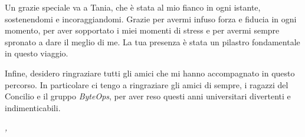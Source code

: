 \vspace{10pt}
\noindent Un grazie speciale va a Tania, che è stata al mio fianco in ogni istante, sostenendomi e incoraggiandomi. Grazie per avermi infuso forza e fiducia in ogni momento, per aver sopportato i miei momenti di stress e per avermi sempre spronato a dare il meglio di me. La tua presenza è stata un pilastro fondamentale in questo viaggio.

\vspace{10pt}
\noindent Infine, desidero ringraziare tutti gli amici che mi hanno accompagnato in questo percorso. In particolare ci tengo a ringraziare gli amici di sempre, i ragazzi del Concilio e il gruppo \textit{ByteOps}, per aver reso questi anni universitari divertenti e indimenticabili.

\vspace{10pt}
\noindent\textit{\myLocation, \myTime}
\hfill \textit{\myName}

\endgroup
